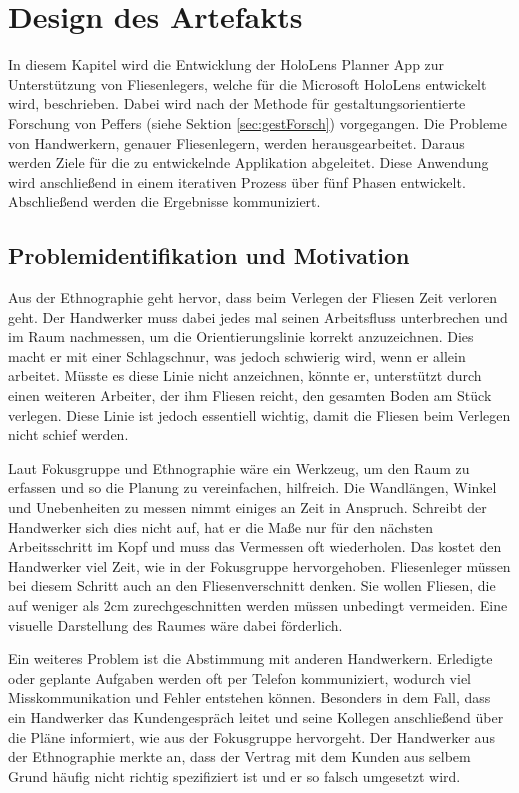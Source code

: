 \chapter{Design des Artefakts}

In diesem Kapitel wird die Entwicklung der HoloLens Planner App zur Unterstützung von Fliesenlegers, welche für die Microsoft HoloLens entwickelt wird, beschrieben. Dabei wird nach der Methode für gestaltungsorientierte Forschung von Peffers (siehe Sektion \ref{sec:gestForsch}) vorgegangen. Die Probleme von Handwerkern, genauer Fliesenlegern, werden herausgearbeitet. Daraus werden Ziele für die zu entwickelnde Applikation abgeleitet. Diese Anwendung wird anschließend in einem iterativen Prozess über fünf Phasen entwickelt. Abschließend werden die Ergebnisse kommuniziert.

\section{Problemidentifikation und Motivation}

Aus der Ethnographie geht hervor, dass beim Verlegen der Fliesen Zeit verloren geht. Der Handwerker muss dabei jedes mal seinen Arbeitsfluss unterbrechen und im Raum nachmessen, um die Orientierungslinie korrekt anzuzeichnen. Dies macht er mit einer Schlagschnur, was jedoch schwierig wird, wenn er allein arbeitet. Müsste es diese Linie nicht anzeichnen, könnte er, unterstützt durch einen weiteren Arbeiter, der ihm Fliesen reicht, den gesamten Boden am Stück verlegen. Diese Linie ist jedoch essentiell wichtig, damit die Fliesen beim Verlegen nicht schief werden.

Laut Fokusgruppe und Ethnographie wäre ein Werkzeug, um den Raum zu erfassen und so die Planung zu vereinfachen, hilfreich. Die Wandlängen, Winkel und Unebenheiten zu messen nimmt einiges an Zeit in Anspruch. Schreibt der Handwerker sich dies nicht auf, hat er die Maße nur für den nächsten Arbeitsschritt im Kopf und muss das Vermessen oft wiederholen. Das kostet den Handwerker viel Zeit, wie in der Fokusgruppe hervorgehoben. Fliesenleger müssen bei diesem Schritt auch an den Fliesenverschnitt denken. Sie wollen Fliesen, die auf weniger als 2cm zurechgeschnitten werden müssen unbedingt vermeiden. Eine visuelle Darstellung des Raumes wäre dabei förderlich. 

Ein weiteres Problem ist die Abstimmung mit anderen Handwerkern. Erledigte oder geplante Aufgaben werden oft per Telefon kommuniziert, wodurch viel Misskommunikation und Fehler entstehen können. Besonders in dem Fall, dass ein Handwerker das Kundengespräch leitet und seine Kollegen anschließend über die Pläne informiert, wie aus der Fokusgruppe hervorgeht. Der Handwerker aus der Ethnographie merkte an, dass der Vertrag mit dem Kunden aus selbem Grund häufig nicht richtig spezifiziert ist und er so falsch umgesetzt wird.

